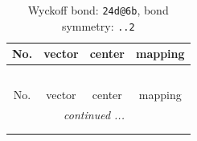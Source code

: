 \documentclass[fleqn,8pt]{jsarticle}
\begin{document}
\renewcommand{\arraystretch}{1.2}
\begin{longtable}{cccc}
\caption{Wyckoff bond: {\tt 24d@6b}, bond symmetry: {\tt ..2}}
 \\
 \hline \hline
No. & vector & center & mapping \\ \hline \endfirsthead

\multicolumn{3}{l}{\tablename\ \thetable{}} \\
 \hline \hline
No. & vector & center & mapping \\ \hline \endhead

 \hline \hline
\multicolumn{3}{r}{\footnotesize\it continued ...} \\ \endfoot

 \hline \hline
\multicolumn{3}{r}{} \\ \endlastfoot


\end{longtable}
\end{document}
